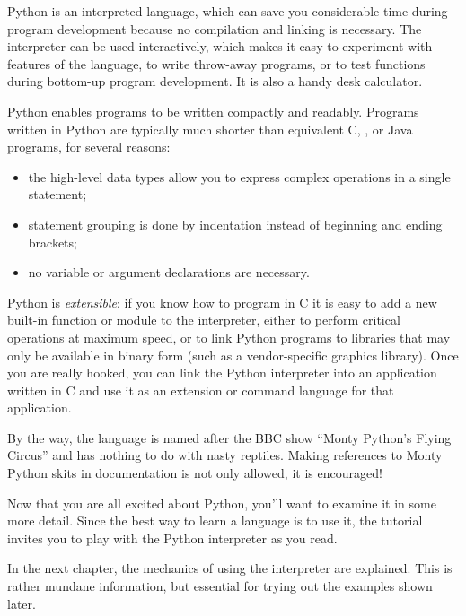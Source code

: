 \documentclass{manual}
\begin{document}
Python is an interpreted language, which can save you considerable time
during program development because no compilation and linking is
necessary.  The interpreter can be used interactively, which makes it
easy to experiment with features of the language, to write throw-away
programs, or to test functions during bottom-up program development.
It is also a handy desk calculator.

Python enables programs to be written compactly and readably.  Programs
written in Python are typically much shorter than equivalent C, 
\Cpp{}, or Java programs, for several reasons:
\begin{itemize}
\item
the high-level data types allow you to express complex operations in a
single statement;
\item
statement grouping is done by indentation instead of beginning and ending
brackets;
\item
no variable or argument declarations are necessary.
\end{itemize}

Python is \emph{extensible}: if you know how to program in C it is easy
to add a new built-in function or module to the interpreter, either to
perform critical operations at maximum speed, or to link Python
programs to libraries that may only be available in binary form (such
as a vendor-specific graphics library).  Once you are really hooked,
you can link the Python interpreter into an application written in C
and use it as an extension or command language for that application.

By the way, the language is named after the BBC show ``Monty Python's
Flying Circus'' and has nothing to do with nasty reptiles.  Making
references to Monty Python skits in documentation is not only allowed,
it is encouraged!


Now that you are all excited about Python, you'll want to examine it
in some more detail.  Since the best way to learn a language is
to use it, the tutorial invites you to play with the Python interpreter
as you read.

In the next chapter, the mechanics of using the interpreter are
explained.  This is rather mundane information, but essential for
trying out the examples shown later.
\end{document}

